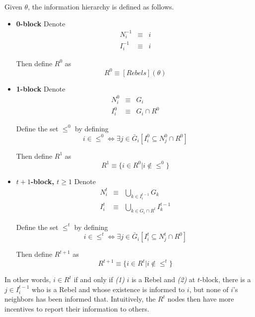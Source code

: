 \documentclass[12pt,letter]{article}
\theoremstyle{definition}
\theoremstyle{remark}
\theoremstyle{claim}
\begin{document}
Given $\theta$, the information hierarchy is defined as follows.
\begin{itemize}

\item \textbf{0-block}
Denote
\begin{eqnarray*}
N^{-1}_i &\equiv &  i \\
I^{-1}_i & \equiv & i
\end{eqnarray*}

Then define $R^0$ as 
\begin{equation}
R^0\equiv [Rebels](\theta)
\end{equation}

\item \textbf{1-block}
Denote
\begin{eqnarray*}
N^0_i &\equiv &  G_i \\
I^0_i & \equiv & G_i\cap R^0
\end{eqnarray*}

Define the set $\leq^0$ by defining
\begin{equation}i\in \leq^0 \Leftrightarrow \exists  j\in \bar{G}_i [I^0_i\subseteq N^0_j\cap R^0]\end{equation}  

Then define $R^1$ as 
\begin{equation}
R^{1} \equiv \{i\in R^0|i\notin \leq^0\}
\end{equation}

\item \textbf{$t+1$-block, $t\geq 1$}
Denote
\begin{eqnarray*}
N^t_i & \equiv & \bigcup_{k\in I^{t-1}_i}G_k \\
I^t_i & \equiv & \bigcup_{k\in G_i\cap R^t}I^{t-1}_k
\end{eqnarray*}


Define the set $\leq^t$ by defining
\begin{equation}i\in \leq^t \Leftrightarrow \exists j\in \bar{G}_i[I^t_i\subseteq N^t_j\cap R^0]\end{equation}

Then define $R^{t+1}$ as 
\begin{equation}
R^{t+1} \equiv  \{i\in R^t|i\notin \leq^t\}
\end{equation}


\end{itemize}

In other words, $i\in R^t$ if and only if \textit{(1)} $i$ is a Rebel and \textit{(2)} at $t$-block, there is a $j\in I^{t-1}_i$ who is a Rebel and whose existence is informed to $i$, but none of $i$'s neighbors has been informed that. Intuitively, the $R^t$ nodes then have more incentives to report their information to others. 
\end{document}

